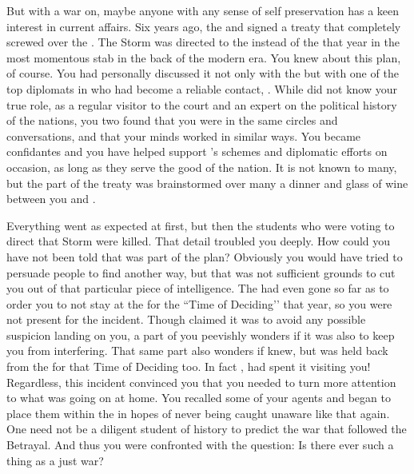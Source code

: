 \documentclass[char]{GL2020}
\begin{document}
But with a war on, maybe anyone with any sense of self preservation has a keen interest in current affairs. Six years ago, the \pFarm{} and \pTech{} signed a treaty that completely screwed over the \pShippies{}. The Storm was directed to the \pShip{} instead of the \pTech{} that year in the most momentous stab in the back of the modern era. You knew about this plan, of course. You had personally discussed it not only with the \cQueen{\Monarch} but with one of the top diplomats in \pFarm{} who had become a reliable contact, \cEvil{\intro}. While \cEvil{\they} did not know your true role, as a regular visitor to the court and an expert on the political history of the nations, you two found that you were in the same circles and conversations, and that your minds worked in similar ways. You became confidantes and you have helped support \cEvil{}’s schemes and diplomatic efforts on occasion, as long as they serve the good of the nation. It is not known to many, but the \pFarm{} part of the treaty was brainstormed over many a dinner and glass of wine between you and \cEvil{}.

Everything went as expected at first, but then the students who were voting to direct that Storm were killed. That detail troubled you deeply. How could you have not been told that was part of the plan? Obviously you would have tried to persuade people to find another way, but that was not sufficient grounds to cut you out of that particular piece of intelligence. The \cQueen{\Monarch} had even gone so far as to order you to not stay at the \pSc{} for the ``Time of Deciding’’ that year, so you were not present for the incident. Though \cQueen{\they} claimed it was to avoid any possible suspicion landing on you, a part of you peevishly wonders if it was also to keep you from interfering. That same part also wonders if \cEvil{} knew, but \cEvil{} was held back from the \pSc{}for that Time of Deciding too. In fact \cEvil{}, had spent it visiting you! Regardless, this incident convinced you that you needed to turn more attention to what was going on at home. You recalled some of your agents and began to place them within the \pFarm{} in hopes of never being caught unaware like that again. One need not be a diligent student of history to predict the war that followed the Betrayal. And thus you were confronted with the question: Is there ever such a thing as a just war?
\end{document}

